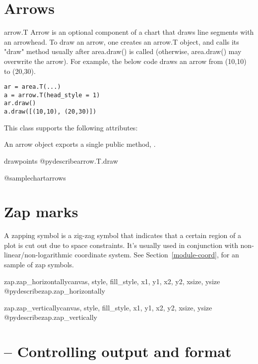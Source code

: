 \documentclass{howto}
\newcommand{\xref}[1]{See Section~\ref{#1}}
\begin{document}
\section{Arrows}

\begin{classdesc*}{arrow.T}
Arrow is an optional component of a chart that draws line segments with
an arrowhead. To draw an arrow, one creates an arrow.T object, and calls
its "draw" method usually after area.draw() is called (otherwise, area.draw()
may overwrite the arrow). For example, the below code draws an arrow
from (10,10) to (20,30).

\begin{verbatim}
ar = area.T(...)
a = arrow.T(head_style = 1)
ar.draw()
a.draw([(10,10), (20,30)])
\end{verbatim}
\end{classdesc*}

This class supports the following attributes:


An arrow object exports a single public method, .

\begin{methoddesc}{draw}{points}
@pydescribe{arrow.T.draw}
\end{methoddesc}

@samplechart{arrows}

\section{Zap marks}

A zapping symbol is a zig-zag symbol that indicates that a certain
region of a plot is cut out due to space constraints. It's usually used
in conjunction with non-linear/non-logarithmic coordinate system.
\xref{module-coord}, for an sample of zap symbols.

\begin{funcdesc}{zap.zap_horizontally}{canvas, style, fill_style, x1, y1, x2, y2, xsize, ysize}
@pydescribe{zap.zap_horizontally}
\end{funcdesc}

\begin{funcdesc}{zap.zap_vertically}{canvas, style, fill_style, x1, y1, x2, y2, xsize, ysize}
@pydescribe{zap.zap_vertically}
\end{funcdesc}

\section{ -- Controlling output and format}
\end{document}
